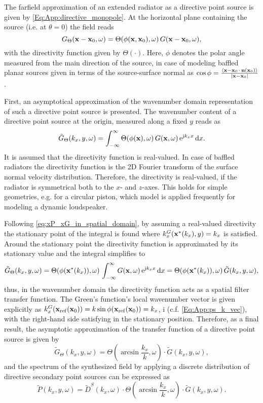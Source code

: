 The farfield approximation of an extended radiator as a directive point source is given by \eqref{Eq:App:directive_monopole}.
At the horizontal plane containing the source (i.e. at $\theta = 0$) the field reads
\begin{equation}
G_{\Theta}(\mathbf{x}-\mathbf{x}_0,\omega) = \Theta(\phi(\mathbf{x},\mathbf{x}_0),\omega) \,
G(\mathbf{x}-\mathbf{x}_0,\omega),
\end{equation}
with the directivity function given by $\Theta(\cdot)$. 
Here, $\phi$ denotes the polar angle measured from the main direction of the source, in case of modeling baffled planar sources given in terms of the source-surface normal as $\cos \phi = \frac{\left< \mathbf{x}-\mathbf{x}_0 \, \cdot \, \mathbf{n}(\mathbf{x}_0) \right>}{|\mathbf{x}-\mathbf{x}_0|}$.

First, an asymptotical approximation of the wavenumber domain representation of such a directive point source is presented.
The wavenumber content of a directive point source at the origin, measured along a fixed $y$ reads as 
\begin{equation}
\tilde{G}_{\Theta}(k_x,y,\omega) = \int_{-\infty}^{\infty} \Theta(\phi(\mathbf{x}),\omega) \,
G(\mathbf{x},\omega) \, \mathrm{e}^{\mathrm{j} k_x x} \, \mathrm{d} x.
\end{equation}
It is assumed that the directivity function is real-valued.
In case of baffled radiators the directivity function is the 2D Fourier transform of the surface normal velocity distribution.
Therefore, the directivity is real-valued, if the radiator is symmetrical both to the $x$- and $z$-axes.
This holds for simple geometries, e.g. for a circular piston, which model is applied frequently for modeling a dynamic loudspeaker.

Following \eqref{eq:xP_xG_in_spatial_domain}, by assuming a real-valued directivity the stationary point of the integral is found where $k_x^{G}(\mathbf{x}^*(k_x),y) = k_x$ is satisfied.
Around the stationary point the directivity function is approximated by its stationary value and the integral simplifies to
\begin{equation}
\tilde{G}_{\Theta}(k_x,y,\omega) = \Theta(\phi(\mathbf{x}^*(k_x)),\omega) \, \int_{-\infty}^{\infty} 
G(\mathbf{x},\omega) \, \mathrm{e}^{\mathrm{j} k_x x} \, \mathrm{d} x =
\Theta(\phi(\mathbf{x}^*(k_x)),\omega) \,
\tilde{G}(k_x,y,\omega),
\end{equation}
thus, in the wavenumber domain the directivity function acts as a spatial filter transfer function.
The Green's function's local wavenumber vector is given explicitly as $k_x^{G}(\mathbf{x}_{\mathrm{ref}}(\mathbf{x}_0)) = k \sin \phi(\mathbf{x}_{\mathrm{ref}}(\mathbf{x}_0)) = k_x$, i (c.f. \eqref{Eq:App:ps_k_vec}), with the right-hand side satisfying in the stationary position.
Therefore, as a final result, the asymptotic approximation of the transfer function of a directive point source is given by
\begin{equation}
\tilde{G}_{\Theta}(k_x,y,\omega) = 
\Theta(\arcsin \frac{k_x}{k},\omega) \cdot 
\tilde{G}(k_x,y,\omega),
\end{equation}
and the spectrum of the synthesized field by applying a discrete distribution of directive secondary point sources can be expressed as
\begin{equation}
\tilde{P}(k_x,y,\omega) = \tilde{D}^S(k_x,\omega) \cdot \Theta(\arcsin \frac{k_x}{k},\omega) \cdot \tilde{G}(k_x,y,\omega).
\end{equation}

